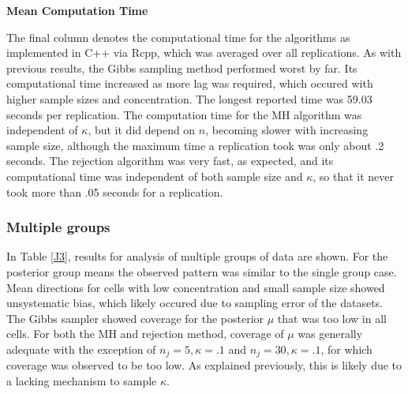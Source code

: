 \documentclass[]{gSCS2e}
\theoremstyle{plain}
\theoremstyle{definition}
\theoremstyle{remark}
\begin{document}
\vspace{0.9cm}
\noindent \textbf{Mean Computation Time}

The final column denotes the computational time for the algorithms as implemented in C++ via Rcpp, which was averaged over all replications. As with previous results, the Gibbs sampling method performed worst by far. Its computational time increased as more lag was required, which occured with higher sample sizes and concentration. The longest reported time was 59.03 seconds per replication. The computation time for the MH algorithm was independent of $\kappa$, but it did depend on $n$, becoming slower with increasing sample size, although the maximum time a replication took was only about .2 seconds. The rejection algorithm was very fast, as expected, and its computational time was independent of both sample size and $\kappa$, so that it never took more than .05 seconds for a replication. 




\subsubsection{Multiple groups}


%
%
%
%
%

In Table \ref{J3}, results for analysis of multiple groups of data are shown. For the posterior group means the observed pattern was similar to the single group case. Mean directions for cells with low concentration and small sample size showed unsystematic bias, which likely occured due to sampling error of the datasets. The Gibbs sampler showed coverage for the posterior $\mu$ that was too low in all cells. For both the MH and rejection method, coverage of $\mu$ was generally adequate with the exception of $n_j=5, \kappa=.1$ and $n_j=30, \kappa=.1$, for which coverage was observed to be too low. As explained previously, this is likely due to a lacking mechanism to sample $\kappa$. 
\end{document}
